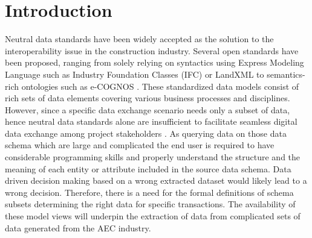 \documentclass[Journal, InsideFigs, DoubleSpace]{ascelike} %
\begin{document}
\section{Introduction}%
Neutral data standards have been widely accepted as the solution to the interoperability issue in the construction industry. Several open standards have been proposed, ranging from solely relying on syntactics using Express Modeling Language such as Industry Foundation Classes (IFC) \cite{buildingsmart} or LandXML \cite{landxmlorg} to semantics-rich ontologies such as e-COGNOS \cite{Lima05}. These standardized data models consist of rich sets of data elements covering various business processes and disciplines. However, since a specific data exchange scenario needs only a subset of data, hence neutral data standards alone are insufficient to facilitate seamless digital data exchange among project stakeholders \cite{Froese03,east12}. As querying data on those data schema which are large and complicated the end user is required to have considerable programming skills and properly understand the structure and the meaning of each entity or attribute included in the source data schema. Data driven decision making based on a wrong extracted dataset would likely lead to a wrong decision. Therefore, there is a need for the formal definitions of schema subsets determining the right data for specific transactions. The availability of these model views will underpin the extraction of data from complicated sets of data generated from the AEC industry. 
\par
\end{document}
